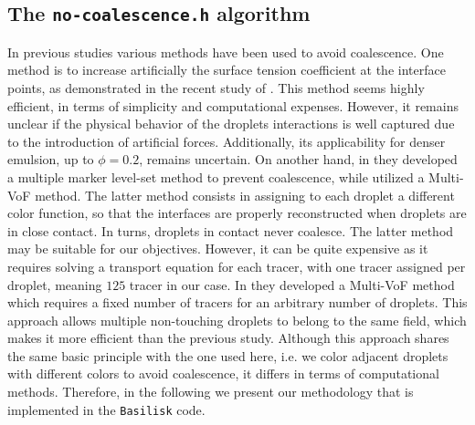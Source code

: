 \subsection{The \texttt{no-coalescence.h} algorithm}

In previous studies various methods have been used to avoid coalescence. 
One method is to increase artificially the surface tension coefficient at the interface points, as demonstrated in the recent study of \citet{hidman2023assessing}.
This method seems highly efficient, in terms of simplicity and computational expenses. However, it remains unclear if the physical behavior of the droplets interactions is well captured due to the introduction of artificial forces. 
Additionally, its applicability for denser emulsion, up to $\phi = 0.2$, remains uncertain. 
On another hand, in \citet{balcazar2015multiple} they developed a multiple marker level-set method to prevent coalescence, while \citet{zhang2021direct} utilized a Multi-VoF method. 
The latter method consists in assigning to each droplet a different color function, so  that the interfaces are properly reconstructed when droplets are in close contact.
In turns, droplets in contact never coalesce.  
The latter method may be suitable for our objectives. 
However, it can be quite expensive as it requires solving a transport equation for each tracer, with one tracer assigned per droplet, meaning $125$ tracer in our case. 
In \citet{karnakov2022computing} they developed a Multi-VoF method which requires a fixed number of tracers for an arbitrary number of droplets.
This approach allows multiple non-touching droplets to belong to the same field, which makes it more efficient than the previous study.
Although this approach shares the same basic principle with the one used here, i.e. we color adjacent droplets with different colors to avoid coalescence, it differs in terms of computational methods. 
Therefore, in the following we present our methodology that is implemented in the \texttt{Basilisk} code. 

